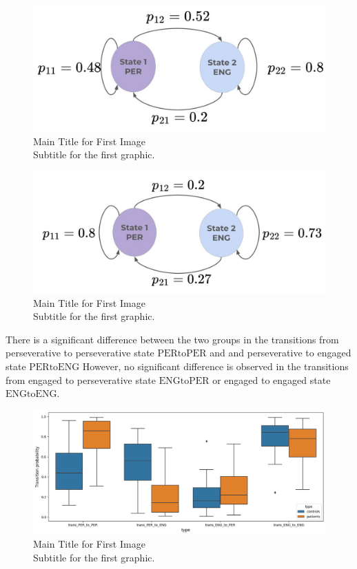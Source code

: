 \begin{figure}[H]
    \centering
    \includegraphics[width=12cm]{MainLayout/Images/chapter7/transition_controls.jpg}
    \caption{Main Title for First Image \\ \small Subtitle for the first graphic.}
    \label{fig:transition_controls}
\end{figure}
\begin{figure}[H]
    \centering
    \includegraphics[width=12cm]{MainLayout/Images/chapter7/transition_patients.jpg}
    \caption{Main Title for First Image \\ \small Subtitle for the first graphic.}
    \label{fig:transition_patients}
\end{figure}

There is a significant difference between the two groups in the transitions from perseverative to perseverative state  $\text{PERtoPER}$ and and perseverative to engaged state $\text{PERtoENG}$ However, no significant difference is observed in the transitions from engaged to perseverative state $\text{ENGtoPER}$ or engaged to engaged state $\text{ENGtoENG}$.
\begin{figure}[H]
    \centering
    \includegraphics[width=14cm]{MainLayout/Images/chapter7/transition_probability.png}
    \caption{Main Title for First Image \\ \small Subtitle for the first graphic.}
    \label{fig:transition_probability}
\end{figure}

